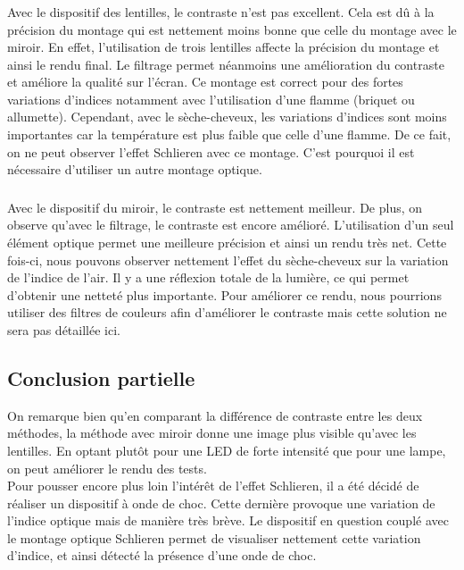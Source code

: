 \subsubsection{}
Avec le dispositif des lentilles, le contraste n’est pas excellent. Cela est dû à la précision du montage qui est nettement moins bonne que celle du montage avec le miroir. En effet, l’utilisation de trois lentilles affecte la précision du montage et ainsi le rendu final. Le filtrage permet néanmoins une amélioration du contraste et améliore la qualité sur l’écran. Ce montage est correct pour des fortes variations d’indices notamment avec l’utilisation d’une flamme (briquet ou allumette). Cependant, avec le sèche-cheveux, les variations d’indices sont moins importantes car la température est plus faible que celle d’une flamme. De ce fait, on ne peut observer l’effet Schlieren avec ce montage. C’est pourquoi il est nécessaire d’utiliser un autre montage optique.
\subsubsection{}
Avec le dispositif du miroir, le contraste est nettement meilleur. De plus, on observe qu’avec le filtrage, le contraste est encore amélioré. L’utilisation d’un seul élément optique permet une meilleure précision et ainsi un rendu très net. Cette fois-ci, nous pouvons observer nettement l’effet du sèche-cheveux sur la variation de l’indice de l’air. Il y a une réflexion totale de la lumière, ce qui permet d’obtenir une netteté plus importante. Pour améliorer ce rendu, nous pourrions utiliser des filtres de couleurs afin d’améliorer le contraste mais cette solution ne sera pas détaillée ici.
\subsection{Conclusion partielle}
On remarque bien qu'en comparant la différence de contraste entre les deux méthodes, la méthode avec miroir donne une image plus visible qu'avec les lentilles. En optant plutôt pour une LED de forte intensité que pour une lampe, on peut améliorer le rendu des tests.\\
Pour pousser encore plus loin l'intérêt de l’effet Schlieren, il a été décidé de réaliser un dispositif à onde de choc. Cette dernière provoque une variation de l’indice optique mais de manière très brève. Le dispositif en question couplé avec le montage optique Schlieren permet de visualiser nettement cette variation d’indice, et ainsi détecté la présence d’une onde de choc.  